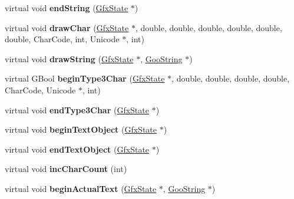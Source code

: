 \begin{DoxyCompactItemize}
\mbox{\label{class_output_dev_a218a55aeb13ac2288ba7f2f3f4ce7f12}} 
virtual void {\bfseries end\+String} (\hyperlink{class_gfx_state}{Gfx\+State} $\ast$)
\item 
\mbox{\label{class_output_dev_a6c9cea15f3fa7ee836e6e793c63803d5}} 
virtual void {\bfseries draw\+Char} (\hyperlink{class_gfx_state}{Gfx\+State} $\ast$, double, double, double, double, double, double, Char\+Code, int, Unicode $\ast$, int)
\item 
\mbox{\label{class_output_dev_a53444c7b8dc07625395c3d25805dfbd2}} 
virtual void {\bfseries draw\+String} (\hyperlink{class_gfx_state}{Gfx\+State} $\ast$, \hyperlink{class_goo_string}{Goo\+String} $\ast$)
\item 
\mbox{\label{class_output_dev_a76e82f369f41ecf05f0ae825947c74cc}} 
virtual G\+Bool {\bfseries begin\+Type3\+Char} (\hyperlink{class_gfx_state}{Gfx\+State} $\ast$, double, double, double, double, Char\+Code, Unicode $\ast$, int)
\item 
\mbox{\label{class_output_dev_a83985f2d8420d2c587f2b5848b0e458a}} 
virtual void {\bfseries end\+Type3\+Char} (\hyperlink{class_gfx_state}{Gfx\+State} $\ast$)
\item 
\mbox{\label{class_output_dev_a5ab9de85c9fd722c86d399169d8f521c}} 
virtual void {\bfseries begin\+Text\+Object} (\hyperlink{class_gfx_state}{Gfx\+State} $\ast$)
\item 
\mbox{\label{class_output_dev_ab8decd3c140caa8265369f1ecfc729a5}} 
virtual void {\bfseries end\+Text\+Object} (\hyperlink{class_gfx_state}{Gfx\+State} $\ast$)
\item 
\mbox{\label{class_output_dev_a91a429fc51f4100808d0b6fb5b5a6d75}} 
virtual void {\bfseries inc\+Char\+Count} (int)
\item 
\mbox{\label{class_output_dev_af1d24bd84cbcda2862c76cf8e081f86d}} 
virtual void {\bfseries begin\+Actual\+Text} (\hyperlink{class_gfx_state}{Gfx\+State} $\ast$, \hyperlink{class_goo_string}{Goo\+String} $\ast$)
\item 

\end{DoxyCompactItemize}
